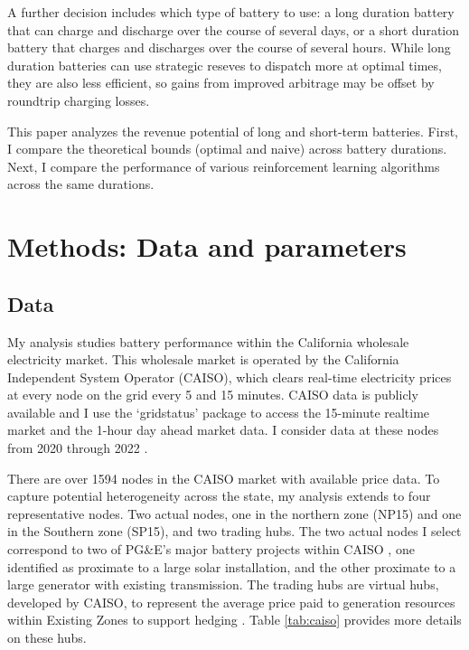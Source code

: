 \documentclass[conference]{IEEEtran}
\begin{document}
A further decision includes which type of battery to use: a long duration battery that can charge and discharge over the course of several days, or a short duration battery that charges and discharges over the course of several hours. While long duration batteries can use strategic reseves to dispatch more at optimal times, they are also less efficient, so gains from improved arbitrage may be offset by roundtrip charging losses.

This paper analyzes the revenue potential of long and short-term batteries. First, I compare the theoretical bounds (optimal and naive) across battery durations. Next, I compare the performance of various reinforcement learning algorithms across the same durations.

\section{Methods: Data and parameters}
\subsection{Data}
My analysis studies battery performance within the California wholesale electricity market. This wholesale market is operated by the California Independent System Operator (CAISO), which clears real-time electricity prices at every node on the grid every 5 and 15 minutes. CAISO data is publicly available and I use the `gridstatus' package to access the 15-minute realtime market and the 1-hour day ahead market data. I consider data at these nodes from 2020 through 2022 \cite{Gridstatus}.

There are over 1594 nodes in the CAISO market with available price data. To capture potential heterogeneity across the state, my analysis extends to four representative nodes. Two actual nodes, one in the northern zone (NP15) and one in the Southern zone (SP15), and two trading hubs. The two actual nodes I select correspond to two of PG\&E's major battery projects within CAISO \cite{Colthorpe} \cite{IEA}, one identified as proximate to a large solar installation, and the other proximate to a large generator with existing transmission. The trading hubs are virtual hubs, developed by CAISO, to represent the average price paid to generation resources within Existing Zones to support hedging \cite{CAISO_trade}. Table \ref{tab:caiso} provides more details on these hubs.
\end{document}
